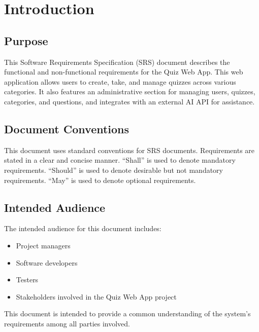 \chapter{Introduction}
\label{chap:Introduction}

\section{Purpose}
\label{sec:Purpose}
This Software Requirements Specification (SRS) document describes the functional and non-functional requirements for the Quiz Web App. This web application allows users to create, take, and manage quizzes across various categories. It also features an administrative section for managing users, quizzes, categories, and questions, and integrates with an external AI API for assistance.

\section{Document Conventions}
\label{sec:DocumentConventions}
This document uses standard conventions for SRS documents. Requirements are stated in a clear and concise manner. ``Shall'' is used to denote mandatory requirements. ``Should'' is used to denote desirable but not mandatory requirements. ``May'' is used to denote optional requirements.

\section{Intended Audience}
\label{sec:IntendedAudience}
The intended audience for this document includes:
\begin{itemize}
    \item Project managers
    \item Software developers
    \item Testers
    \item Stakeholders involved in the Quiz Web App project
\end{itemize}
This document is intended to provide a common understanding of the system's requirements among all parties involved.

